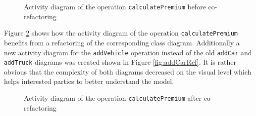 \documentclass{llncs}
\begin{document}
\begin{figure}[h!t]
 \centering
{}
 \caption{Activity diagram of the operation \texttt{calculatePremium} before co-refactoring}
 \label{fig:calculatePremium}
\end{figure}

Figure \ref{fig:calculatePremiumRef} shows how the activity diagram of the operation \texttt{calculatePremium} benefits from a refactoring of the corresponding 
class diagram. Additionally a new activity diagram for the \texttt{addVehicle} operation instead of the old 
\texttt{addCar} and \texttt{addTruck} diagrams was created shown in Figure \ref{fig:addCarRef}. It is rather obvious 
that the complexity of both diagrams decreased on the visual level which helps interested parties to better understand the 
model.

\begin{figure}[h!t]
 \centering
 \caption{Activity diagram of the operation \texttt{calculatePremium} after co-refactoring}
 \label{fig:calculatePremiumRef}
\end{figure}
\end{document}
